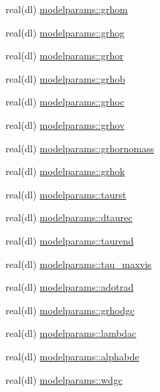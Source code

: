 \begin{DoxyCompactItemize}
\item 
real(dl) \mbox{\hyperlink{namespacemodelparams_a2ef8c57ec3ca12626295c0af7c8891b9}{modelparams\+::grhom}}
\item 
real(dl) \mbox{\hyperlink{namespacemodelparams_adcca33df63a9b35b19c2f220028498b1}{modelparams\+::grhog}}
\item 
real(dl) \mbox{\hyperlink{namespacemodelparams_aad31721fc53cb058072f19818ffd7178}{modelparams\+::grhor}}
\item 
real(dl) \mbox{\hyperlink{namespacemodelparams_a0319101f7e0e2e39563baa34b7a77453}{modelparams\+::grhob}}
\item 
real(dl) \mbox{\hyperlink{namespacemodelparams_ae9f905639d83dffafeac77f6c039c632}{modelparams\+::grhoc}}
\item 
real(dl) \mbox{\hyperlink{namespacemodelparams_a8c39e1bc5579fca9396e8d526ccd36f7}{modelparams\+::grhov}}
\item 
real(dl) \mbox{\hyperlink{namespacemodelparams_a4c2d2ed96d5c953938367cc867157072}{modelparams\+::grhornomass}}
\item 
real(dl) \mbox{\hyperlink{namespacemodelparams_a01ee7412b553c0b2ab7ea2fcc5ee0a24}{modelparams\+::grhok}}
\item 
real(dl) \mbox{\hyperlink{namespacemodelparams_aa2deb415a6c7c9f406093a8c6853d01c}{modelparams\+::taurst}}
\item 
real(dl) \mbox{\hyperlink{namespacemodelparams_a4c0c5110385ed23392c37abe83c629d5}{modelparams\+::dtaurec}}
\item 
real(dl) \mbox{\hyperlink{namespacemodelparams_a914411aec3209257f74b174bae6b2a10}{modelparams\+::taurend}}
\item 
real(dl) \mbox{\hyperlink{namespacemodelparams_a9d0fd2e2f02494b8ed27d6c924d7c494}{modelparams\+::tau\+\_\+maxvis}}
\item 
real(dl) \mbox{\hyperlink{namespacemodelparams_a4e46748f7df40701a9962f9ddac9544e}{modelparams\+::adotrad}}
\item 
real(dl) \mbox{\hyperlink{namespacemodelparams_a2cf17001b748d255082420e5cdcb52be}{modelparams\+::grhodgc}}
\item 
real(dl) \mbox{\hyperlink{namespacemodelparams_adba219855fecf94eab76932919bad160}{modelparams\+::lambdac}}
\item 
real(dl) \mbox{\hyperlink{namespacemodelparams_a0a62f172d9cb5307499eada437c8f282}{modelparams\+::alphabde}}
\item 
real(dl) \mbox{\hyperlink{namespacemodelparams_ad94fb2bc6179da9e6382c136f6c94bfe}{modelparams\+::wdgc}}

\end{DoxyCompactItemize}

